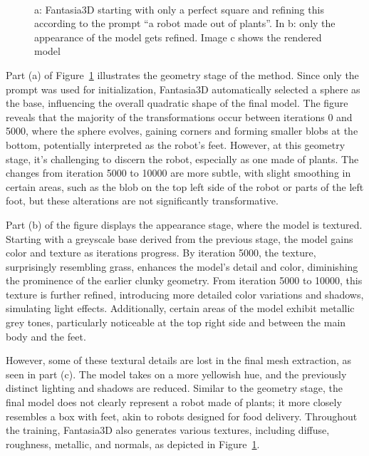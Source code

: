 \begin{figure}[ht]
\begin{subfigure}[b]{0.37\textwidth}
        \caption{}
    \end{subfigure}
    \caption{a: Fantasia3D starting with only a perfect square and refining this according to the prompt ``a robot made out of plants''. In b: only the appearance of the model gets refined. Image c shows the rendered model }~\label{fig:generationFantasia}
\end{figure}

Part (a) of Figure~\ref{fig:generationFantasia} illustrates the geometry stage of the method. Since only the prompt was used for initialization, Fantasia3D automatically selected a sphere as the base, influencing the overall quadratic shape of the final model. The figure reveals that the majority of the transformations occur between iterations 0 and 5000, where the sphere evolves, gaining corners and forming smaller blobs at the bottom, potentially interpreted as the robot's feet. However, at this geometry stage, it's challenging to discern the robot, especially as one made of plants. The changes from iteration 5000 to 10000 are more subtle, with slight smoothing in certain areas, such as the blob on the top left side of the robot or parts of the left foot, but these alterations are not significantly transformative.

Part (b) of the figure displays the appearance stage, where the model is textured. Starting with a greyscale base derived from the previous stage, the model gains color and texture as iterations progress. By iteration 5000, the texture, surprisingly resembling grass, enhances the model's detail and color, diminishing the prominence of the earlier clunky geometry. From iteration 5000 to 10000, this texture is further refined, introducing more detailed color variations and shadows, simulating light effects. Additionally, certain areas of the model exhibit metallic grey tones, particularly noticeable at the top right side and between the main body and the feet. 

However, some of these textural details are lost in the final mesh extraction, as seen in part (c). The model takes on a more yellowish hue, and the previously distinct lighting and shadows are reduced. Similar to the geometry stage, the final model does not clearly represent a robot made of plants; it more closely resembles a box with feet, akin to robots designed for food delivery. Throughout the training, Fantasia3D also generates various textures, including diffuse, roughness, metallic, and normals, as depicted in Figure~\ref{fig:generationFantasia}.

